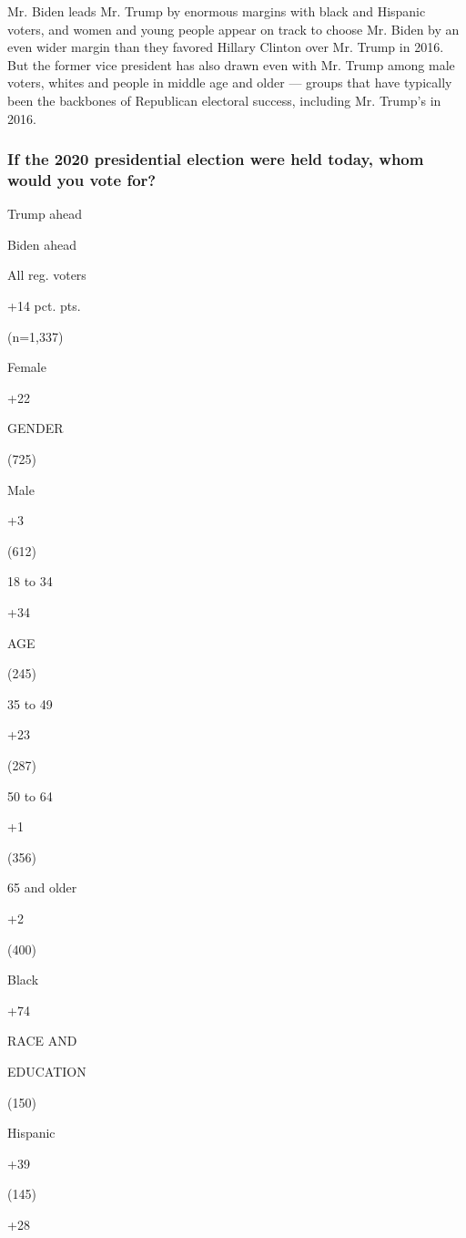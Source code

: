 Mr. Biden leads Mr. Trump by enormous margins with black and Hispanic
voters, and women and young people appear on track to choose Mr. Biden
by an even wider margin than they favored Hillary Clinton over Mr. Trump
in 2016. But the former vice president has also drawn even with Mr.
Trump among male voters, whites and people in middle age and older ---
groups that have typically been the backbones of Republican electoral
success, including Mr. Trump's in 2016.

\hypertarget{if-the-2020-presidential-election-were-held-today-whom-would-you-vote-for}{%
\subsubsection{If the 2020 presidential election were held today, whom
would you vote
for?}\label{if-the-2020-presidential-election-were-held-today-whom-would-you-vote-for}}

Trump ahead

Biden ahead

All reg. voters

+14 pct. pts.

(n=1,337)

Female

+22

GENDER

(725)

Male

+3

(612)

18 to 34

+34

AGE

(245)

35 to 49

+23

(287)

50 to 64

+1

(356)

65 and older

+2

(400)

Black

+74

RACE AND

EDUCATION

(150)

Hispanic

+39

(145)

+28


